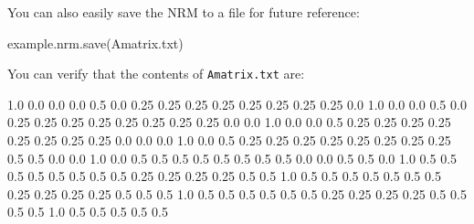 \documentclass[
  letterpaper,
  DIV=11,
  numbers=noendperiod]{scrreprt}
\newenvironment{Shaded}{\begin{snugshade}}{\end{snugshade}}
\newcommand{\FloatTok}[1]{\textcolor[rgb]{0.68,0.00,0.00}{#1}}
\newcommand{\NormalTok}[1]{\textcolor[rgb]{0.00,0.23,0.31}{#1}}
\newcommand{\StringTok}[1]{\textcolor[rgb]{0.13,0.47,0.30}{#1}}
\begin{document}
You can also easily save the NRM to a file for future reference:

\begin{Shaded}
\begin{Highlighting}[]
\NormalTok{example.nrm.save(}\StringTok{\textquotesingle{}Amatrix.txt\textquotesingle{}}\NormalTok{)}
\end{Highlighting}
\end{Shaded}

You can verify that the contents of \texttt{Amatrix.txt} are:

\begin{Shaded}
\begin{Highlighting}[]
\FloatTok{1.0}  \FloatTok{0.0}  \FloatTok{0.0}  \FloatTok{0.0}  \FloatTok{0.5} \FloatTok{0.0} \FloatTok{0.25} \FloatTok{0.25} \FloatTok{0.25} \FloatTok{0.25} \FloatTok{0.25} \FloatTok{0.25} \FloatTok{0.25} \FloatTok{0.25}
\FloatTok{0.0}  \FloatTok{1.0}  \FloatTok{0.0}  \FloatTok{0.0}  \FloatTok{0.5} \FloatTok{0.0} \FloatTok{0.25} \FloatTok{0.25} \FloatTok{0.25} \FloatTok{0.25} \FloatTok{0.25} \FloatTok{0.25} \FloatTok{0.25} \FloatTok{0.25}
\FloatTok{0.0}  \FloatTok{0.0}  \FloatTok{1.0}  \FloatTok{0.0}  \FloatTok{0.0} \FloatTok{0.5} \FloatTok{0.25} \FloatTok{0.25} \FloatTok{0.25} \FloatTok{0.25} \FloatTok{0.25} \FloatTok{0.25} \FloatTok{0.25} \FloatTok{0.25}
\FloatTok{0.0}  \FloatTok{0.0}  \FloatTok{0.0}  \FloatTok{1.0}  \FloatTok{0.0} \FloatTok{0.5} \FloatTok{0.25} \FloatTok{0.25} \FloatTok{0.25} \FloatTok{0.25} \FloatTok{0.25} \FloatTok{0.25} \FloatTok{0.25} \FloatTok{0.25}
\FloatTok{0.5}  \FloatTok{0.5}  \FloatTok{0.0}  \FloatTok{0.0}  \FloatTok{1.0} \FloatTok{0.0} \FloatTok{0.5}  \FloatTok{0.5}  \FloatTok{0.5}  \FloatTok{0.5}  \FloatTok{0.5}  \FloatTok{0.5}  \FloatTok{0.5}  \FloatTok{0.5}
\FloatTok{0.0}  \FloatTok{0.0}  \FloatTok{0.5}  \FloatTok{0.5}  \FloatTok{0.0} \FloatTok{1.0} \FloatTok{0.5}  \FloatTok{0.5}  \FloatTok{0.5}  \FloatTok{0.5}  \FloatTok{0.5}  \FloatTok{0.5}  \FloatTok{0.5}  \FloatTok{0.5}
\FloatTok{0.25} \FloatTok{0.25} \FloatTok{0.25} \FloatTok{0.25} \FloatTok{0.5} \FloatTok{0.5} \FloatTok{1.0}  \FloatTok{0.5}  \FloatTok{0.5}  \FloatTok{0.5}  \FloatTok{0.5}  \FloatTok{0.5}  \FloatTok{0.5}  \FloatTok{0.5}
\FloatTok{0.25} \FloatTok{0.25} \FloatTok{0.25} \FloatTok{0.25} \FloatTok{0.5} \FloatTok{0.5} \FloatTok{0.5}  \FloatTok{1.0}  \FloatTok{0.5}  \FloatTok{0.5}  \FloatTok{0.5}  \FloatTok{0.5}  \FloatTok{0.5}  \FloatTok{0.5}
\FloatTok{0.25} \FloatTok{0.25} \FloatTok{0.25} \FloatTok{0.25} \FloatTok{0.5} \FloatTok{0.5} \FloatTok{0.5}  \FloatTok{0.5}  \FloatTok{1.0}  \FloatTok{0.5}  \FloatTok{0.5}  \FloatTok{0.5}  \FloatTok{0.5}  \FloatTok{0.5}

\end{Highlighting}
\end{Shaded}
\end{document}
